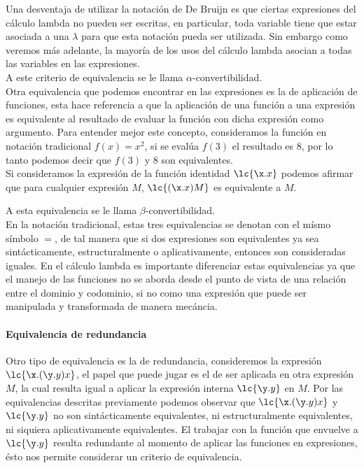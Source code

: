 Una desventaja de utilizar la notación de De Bruijn es que ciertas expresiones
del cálculo lambda no pueden ser escritas, en particular, toda variable tiene
que estar asociada a una \(\lambda\) para que esta notación pueda ser utilizada.
Sin embargo como veremos más adelante, la mayoría de los usos del cálculo lambda
asocian a todas las variables en las expresiones. \\

A este criterio de equivalencia se le llama \(\alpha\)-convertibilidad. \\

Otra equivalencia que podemos encontrar en las expresiones es la de aplicación
de funciones, esta hace referencia a que la aplicación de una función a una
expresión es equivalente al resultado de evaluar la función con dicha expresión
como argumento. Para entender mejor este concepto, consideramos la función en
notación tradicional \(f(x)=x^2\), si se evalúa \(f(3)\) el resultado es 8, por
lo tanto podemos decir que \(f(3)\) y 8 son equivalentes. \\

Si consideramos la expresión de la función identidad \(\lc{\x.x}\) podemos
afirmar que para cualquier expresión \(M\), \(\lc{(\x.x) M}\) es equivalente a
\(M\).

A esta equivalencia se le llama \(\beta\)-convertibilidad.\\

En la notación tradicional, estas tres equivalencias se denotan con el mísmo
símbolo \(=\), de tal manera que si dos expresiones son equivalentes ya sea
sintácticamente, estructuralmente o aplicativamente, entonces son consideradas
iguales. En el cálculo lambda es importante diferenciar estas equivalencias ya
que el manejo de las funciones no se aborda desde el punto de vista de una
relación entre el dominio y codominio, si no como una expresión que puede ser
manipulada y transformada de manera mecáncia.\\

\paragraph{Equivalencia de redundancia}

Otro tipo de equivalencia es la de redundancia, consideremos la expresión
\(\lc{\x.(\y.y) x}\), el papel que puede jugar es el de ser aplicada en otra
expresión \(M\), la cual resulta igual a aplicar la expresión interna
\(\lc{\y.y}\) en \(M\). Por las equivalencias descritas previamente podemos
observar que \(\lc{\x.(\y.y) x}\) y \(\lc{\y.y}\) no son sintácticamente
equivalentes, ni estructuralmente equivalentes, ni siquiera aplicativamente
equivalentes. El trabajar con la función que envuelve a \(\lc{\y.y}\) resulta
redundante al momento de aplicar las funciones en expresiones, ésto nos permite
considerar un criterio de equivalencia.\\

